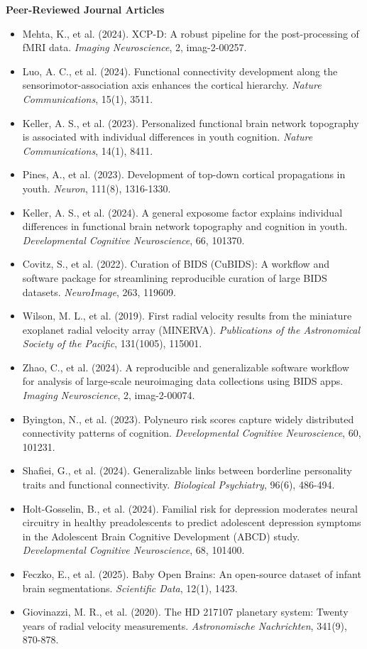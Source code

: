 \documentclass[a4paper,11pt]{article}
\newcommand{\resumePubItemListStart}{\begin{justify}\begin{itemize}[leftmargin=3ex, rightmargin=2ex, labelsep=1.2mm,itemsep=1.0mm]\small}
\newcommand{\resumePubHeading}[1]{\vspace{1mm}\item[] \textbf{#1}\vspace{-2.5mm}}
\newcommand{\resumePubItemListEnd}{\end{itemize}\end{justify}\vspace{-1mm}}
\begin{document}
\resumePubHeading{Peer-Reviewed Journal Articles}
\resumePubItemListStart
\item[] Mehta, K., et al. (2024). XCP-D: A robust pipeline for the post-processing of fMRI data. \textit{Imaging Neuroscience}, 2, imag-2-00257.
\item[] Luo, A. C., et al. (2024). Functional connectivity development along the sensorimotor-association axis enhances the cortical hierarchy. \textit{Nature Communications}, 15(1), 3511.
\item[] Keller, A. S., et al. (2023). Personalized functional brain network topography is associated with individual differences in youth cognition. \textit{Nature Communications}, 14(1), 8411.
\item[] Pines, A., et al. (2023). Development of top-down cortical propagations in youth. \textit{Neuron}, 111(8), 1316-1330.
\item[] Keller, A. S., et al. (2024). A general exposome factor explains individual differences in functional brain network topography and cognition in youth. \textit{Developmental Cognitive Neuroscience}, 66, 101370.
\item[] Covitz, S., et al. (2022). Curation of BIDS (CuBIDS): A workflow and software package for streamlining reproducible curation of large BIDS datasets. \textit{NeuroImage}, 263, 119609.
\item[] Wilson, M. L., et al. (2019). First radial velocity results from the miniature exoplanet radial velocity array (MINERVA). \textit{Publications of the Astronomical Society of the Pacific}, 131(1005), 115001.
\item[] Zhao, C., et al. (2024). A reproducible and generalizable software workflow for analysis of large-scale neuroimaging data collections using BIDS apps. \textit{Imaging Neuroscience}, 2, imag-2-00074.
\item[] Byington, N., et al. (2023). Polyneuro risk scores capture widely distributed connectivity patterns of cognition. \textit{Developmental Cognitive Neuroscience}, 60, 101231.
\item[] Shafiei, G., et al. (2024). Generalizable links between borderline personality traits and functional connectivity. \textit{Biological Psychiatry}, 96(6), 486-494.
\item[] Holt-Gosselin, B., et al. (2024). Familial risk for depression moderates neural circuitry in healthy preadolescents to predict adolescent depression symptoms in the Adolescent Brain Cognitive Development (ABCD) study. \textit{Developmental Cognitive Neuroscience}, 68, 101400.
\item[] Feczko, E., et al. (2025). Baby Open Brains: An open-source dataset of infant brain segmentations. \textit{Scientific Data}, 12(1), 1423.
\item[] Giovinazzi, M. R., et al. (2020). The HD 217107 planetary system: Twenty years of radial velocity measurements. \textit{Astronomische Nachrichten}, 341(9), 870-878.
\resumePubItemListEnd
\end{document}
